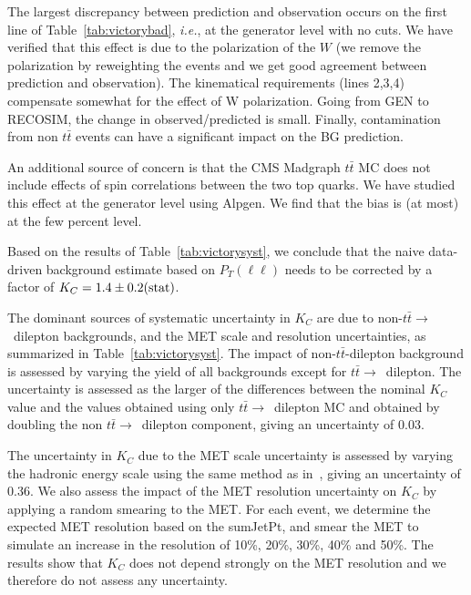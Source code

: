 The largest discrepancy between prediction and observation occurs on the first 
line of Table~\ref{tab:victorybad}, {\em i.e.}, at the generator level with no
cuts.  We have verified that this effect is due to the polarization of
the $W$ (we remove the polarization by reweighting the events and we get
good agreement between prediction and observation).  The kinematical 
requirements (lines 2,3,4) compensate somewhat for the effect of W polarization. 
Going from GEN to RECOSIM, the change in observed/predicted is small.  
Finally, contamination from non $t\bar{t}$
events can have a significant impact on the BG prediction.  

An additional source of concern is that the CMS Madgraph $t\bar{t}$ MC does
not include effects of spin correlations between the two top quarks.  
We have studied this effect at the generator level using Alpgen.  We find
that the bias is (at most) at the few percent level.

Based on the results of Table~\ref{tab:victorysyst}, we conclude that the 
naive data-driven background estimate based on $P_T{(\ell\ell)}$ needs to 
be corrected by a factor of $ K_C = 1.4 \pm 0.2({\rm stat})$.

The dominant sources of systematic uncertainty in $K_C$ are due to non-$t\bar{t} \to$~dilepton backgrounds,
and the MET scale and resolution uncertainties, as summarized in Table~\ref{tab:victorysyst}. 
The impact of non-$t\bar{t}$-dilepton background is assessed
by varying the yield of all backgrounds except for $t\bar{t} \to$~dilepton. 
The uncertainty is assessed as the larger of the differences between the nominal $K_C$ value and the values
obtained using only $t\bar{t} \to$~dilepton MC and obtained by doubling the non $t\bar{t} \to$~dilepton component,
giving an uncertainty of $0.03$.

The uncertainty in $K_C$ due to the MET scale uncertainty is assessed by varying the hadronic energy scale using
the same method as in~\cite{ref:top}, giving an uncertainty of 0.36. 
We also assess the impact of the MET resolution 
uncertainty on $K_C$ by applying a random smearing to the MET. For each event, we determine the expected MET resolution 
based on the sumJetPt, and smear the MET to simulate an increase in the resolution of 10\%, 20\%, 30\%, 40\% and 50\%. 
The results show that $K_C$ does not depend strongly on the MET resolution and we therefore do not assess any uncertainty.

